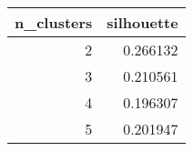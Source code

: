 \begin{tabular}{rr}
\toprule
 n\_clusters &  silhouette \\
\midrule
          2 &    0.266132 \\
          3 &    0.210561 \\
          4 &    0.196307 \\
          5 &    0.201947 \\
\bottomrule
\end{tabular}
